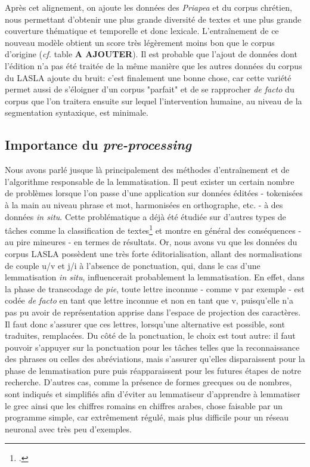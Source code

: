 Après cet alignement, on ajoute les données des \textit{Priapea} et du corpus chrétien, nous permettant d'obtenir une plus grande diversité de textes et une plus grande couverture thématique et temporelle et donc lexicale. L'entraînement de ce nouveau modèle obtient un score très légèrement moins bon que le corpus d'origine (\textit{cf.} table \textbf{A AJOUTER}). Il est probable que l'ajout de données dont l'édition n'a pas été traitée de la même manière que les autres données du corpus du LASLA ajoute du bruit: c'est finalement une bonne chose, car cette variété permet aussi de s'éloigner d'un corpus "parfait" et de se rapprocher \textit{de facto} du corpus que l'on traitera ensuite sur lequel l'intervention humaine, au niveau de la segmentation syntaxique, est minimale.

\subsection{Importance du \textit{pre-processing}}

Nous avons parlé jusque là principalement des méthodes d'entraînement et de l'algorithme responsable de la lemmatisation. Il peut exister un certain nombre de problèmes lorsque l'on passe d'une application sur données éditées - tokenisées à la main au niveau phrase et mot, harmonisées en orthographe, etc. - à des données \textit{in situ}. Cette problématique a déjà été étudiée sur d'autres types de tâches comme la classification de textes\footcite{camacho-collados_role_2018} et montre en général des conséquences - au pire mineures - en termes de résultats. Or, nous avons vu que les données du corpus LASLA possèdent une très forte éditorialisation, allant des normalisations de couple u/v et j/i à l'absence de ponctuation, qui, dans le cas d'une lemmatisation \textit{in situ}, influencerait probablement la lemmatisation. En effet, dans la phase de transcodage de \textit{pie}, toute lettre inconnue - comme v par exemple - est codée \textit{de facto} en tant que lettre inconnue et non en tant que v, puisqu'elle n'a pas pu avoir de représentation apprise dans l'espace de projection des caractères. Il faut donc s'assurer que ces lettres, lorsqu'une alternative est possible, sont traduites, remplacées. Du côté de la ponctuation, le choix est tout autre: il faut pouvoir s'appuyer sur la ponctuation pour les tâches telles que la reconnaissance des phrases ou celles des abréviations, mais s'assurer qu'elles disparaissent pour la phase de lemmatisation pure puis réapparaissent pour les futures étapes de notre recherche. D'autres cas, comme la présence de formes grecques ou de nombres, sont indiqués et simplifiés afin d'éviter au lemmatiseur d'apprendre à lemmatiser le grec ainsi que les chiffres romains en chiffres arabes, chose faisable par un programme simple, car extrêmement régulé, mais plus difficile pour un réseau neuronal avec très peu d'exemples.

